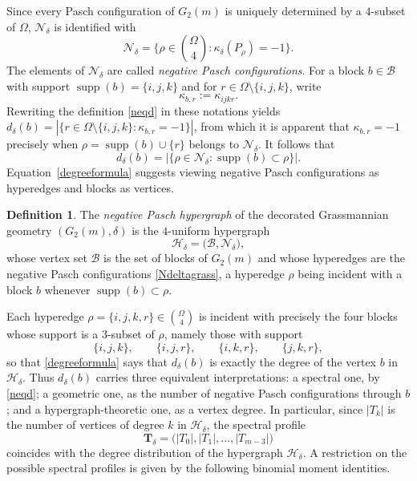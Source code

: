 \documentclass[times,11pt,reqno]{amsproc}
\theoremstyle{definition}
\newtheorem{definition}[theorem]{Definition}
\numberwithin{equation}{section}
\DeclareMathOperator{\supp}{supp}
\begin{document}
Since every Pasch configuration of $G_2(m)$ is uniquely determined by a
$4$-subset of $\Omega$, $\mathcal N_\delta$ is identified with
\begin{equation}\label{Ndeltagrass}
\mathcal N_\delta
=
\{\rho\in\binom{\Omega}{4}:
\kappa_\delta(P_\rho)=-1\}.
\end{equation}
The elements of $\mathcal N_\delta$ are called \emph{negative Pasch configurations}. For a block
$b\in\mathcal B$ with support $\supp(b) = \{i,j,k\}$ and for
$r\in\Omega\setminus\{i,j,k\}$, write
$$
\kappa_{b,r}
:=
\kappa_{ijkr}.
$$
Rewriting the definition \eqref{neqd} in these notations yields
$d_\delta(b) = |\{r\in\Omega\setminus\{i,j,k\}:\kappa_{b,r}=-1\}|$, from which it is apparent that $\kappa_{b,r}=-1$ precisely when $\rho=\supp(b)\cup\{r\}$ belongs to $\mathcal N_\delta$. It follows that
\begin{equation}\label{degreeformula}
d_\delta(b)
=
|\{\rho\in\mathcal N_\delta:\supp(b)\subset\rho\}|.
\end{equation}
Equation~\eqref{degreeformula} suggests viewing negative Pasch configurations as
hyperedges and blocks as vertices.

\begin{definition}
The \emph{negative Pasch hypergraph} of the decorated Grassmannian
geometry $(G_2(m),\delta)$ is the $4$-uniform hypergraph
\begin{equation}
\mathscr H_\delta
=
\bigl(
\mathcal B,
\mathcal N_\delta
\bigr),
\end{equation}
whose vertex set $\mathcal B$ is the set of blocks of $G_2(m)$ and whose hyperedges
are the negative Pasch configurations \eqref{Ndeltagrass}, a hyperedge $\rho$ being
incident with a block $b$ whenever $\supp(b)\subset\rho$.
\end{definition}

Each hyperedge $\rho=\{i,j,k,r\}\in\binom{\Omega}{4}$ is incident with
precisely the four blocks whose support is a $3$-subset of $\rho$,
namely those with support
\begin{equation}
\{i,j,k\},\qquad \{i,j,r\},\qquad \{i,k,r\},\qquad \{j,k,r\},
\end{equation}
so that \eqref{degreeformula} says that $d_\delta(b)$ is exactly
the degree of the vertex $b$ in $\mathscr H_\delta$. Thus
$d_\delta(b)$ carries three equivalent interpretations: a spectral
one, by \eqref{neqd}; a geometric one, as the number of negative Pasch
configurations through $b$; and a hypergraph-theoretic one, as a
vertex degree. In particular, since $|T_k|$ is the number of vertices of
degree $k$ in $\mathscr H_\delta$, the spectral profile
\begin{equation}
\mathbf T_\delta
=
\bigl(|T_0|,|T_1|,\dots,|T_{m-3}|\bigr)
\end{equation}
coincides with the degree distribution of the hypergraph
$\mathscr H_\delta$.
A restriction on the possible spectral profiles is given by the
following binomial moment identities.
\end{document}

